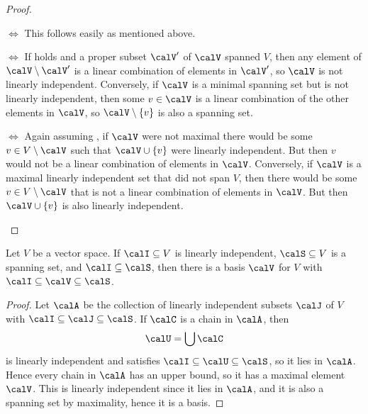 \begin{proof}
\begin{proofsec*}
    \item[\itemref{enum:linearly-independent-and-span} $\iff$ \itemref{enum:essentially-unique-linear-combination}]
    This follows easily as mentioned above.

    \item[\itemref{enum:linearly-independent-and-span} $\iff$ \itemref{enum:minimal-spanning-set}]
    If  holds and a proper subset $\calV'$ of $\calV$ spanned $V$, then any element of $\calV \setminus \calV'$ is a linear combination of elements in $\calV'$, so $\calV$ is not linearly independent. Conversely, if $\calV$ is a minimal spanning set but is not linearly independent, then some $v \in \calV$ is a linear combination of the other elements in $\calV$, so $\calV \setminus \{v\}$ is also a spanning set.

    \item[\itemref{enum:linearly-independent-and-span} $\iff$ \itemref{enum:maximal-linearly-independent-set}]
    Again assuming , if $\calV$ were not maximal there would be some $v \in V \setminus \calV$ such that $\calV \union \{v\}$ were linearly independent. But then $v$ would not be a linear combination of elements in $\calV$. Conversely, if $\calV$ is a maximal linearly independent set that did not span $V$, then there would be some $v \in V \setminus \calV$ that is not a linear combination of elements in $\calV$. But then $\calV \union \{v\}$ is also linearly independent.
\end{proofsec*}
\end{proof}


\begin{theorem}
    \label{prop:basis-existence}
    Let $V$ be a vector space. If $\calI \subseteq V$ is linearly independent, $\calS \subseteq V$ is a spanning set, and $\calI \subseteq \calS$, then there is a basis $\calV$ for $V$ with $\calI \subseteq \calV \subseteq \calS$.
\end{theorem}

\begin{proof}
    Let $\calA$ be the collection of linearly independent subsets $\calJ$ of $V$ with $\calI \subseteq \calJ \subseteq \calS$. If $\calC$ is a chain in $\calA$, then
    \begin{equation*}
        \calU
            = \bigunion \calC
    \end{equation*}
    is linearly independent and satisfies $\calI \subseteq \calU \subseteq \calS$, so it lies in $\calA$. Hence every chain in $\calA$ has an upper bound, so it has a maximal element $\calV$. This is linearly independent since it lies in $\calA$, and it is also a spanning set by maximality, hence it is a basis.
\end{proof}


